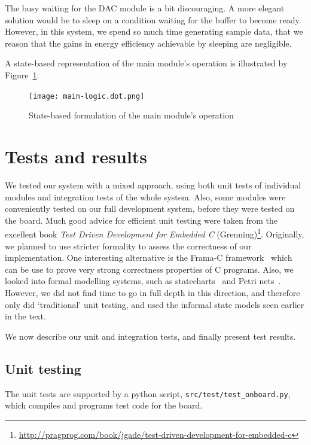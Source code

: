 \documentclass[a4paper,9pt]{article}
\begin{document}
The busy waiting for the DAC module is a bit discouraging. A more elegant
solution would be to sleep on a condition waiting for the buffer to become
ready. However, in this system, we spend so much time generating sample data,
that we reason that the gains in energy efficiency achievable by sleeping are
negligible.

A state-based representation of the main module's operation is illustrated
by Figure~\ref{fig:mainlogic}. 

\begin{figure}[h!]
    \centering
    \texttt{[image: main-logic.dot.png]}
    \caption{State-based formulation of the main module's operation}
    \label{fig:mainlogic}
\end{figure}

\clearpage



\section{Tests and results}
\label{sec:tests}
We tested our system with a mixed approach, using both unit tests of
individual modules and integration tests of the whole system. Also, some
modules were conveniently tested on our full development system, before they
were tested on the board. Much good advice for efficient unit testing were
taken from the excellent book \emph{Test Driven Development for Embedded C}
(Grenning)\footnote{\url{
http://pragprog.com/book/jgade/test-driven-development-for-embedded-c}}.
Originally, we planned to use stricter formality to assess the correctness of
our implementation. One interesting alternative is the Frama-C
framework~\cite{framac} which can be use to prove very strong correctness
properties of C programs. Also, we looked into formal modelling systems, such
as statecharts~\cite{statecharts} and Petri nets~\cite{petrinets}. However, we
did not find time to go in full depth in this direction, and therefore only
did `traditional' unit testing, and used the informal state models seen
earlier in the text.

We now describe our unit and integration tests, and finally present test
results.

\subsection{Unit testing}
The unit tests are supported by a python script,
\texttt{src/test/test\_onboard.py}, which compiles and programs test code for
the board. 
\end{document}
